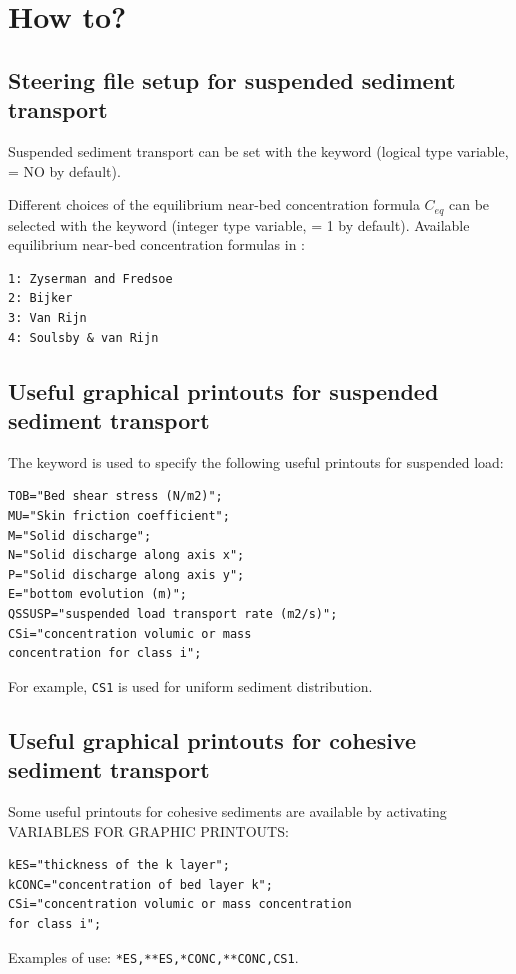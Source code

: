 \pagebreak
\section{How to?}
\subsection{Steering file setup for suspended sediment transport}
Suspended sediment transport can be set with the keyword  (logical type variable, {\ttfamily = NO} by default).

Different choices of the equilibrium near-bed concentration formula $C_{eq}$ can be selected with the keyword  (integer type variable, {\ttfamily = 1} by default). Available equilibrium near-bed concentration formulas in \gaia{}:
\begin{verbatim}
1: Zyserman and Fredsoe
2: Bijker
3: Van Rijn
4: Soulsby & van Rijn
\end{verbatim}

\subsection{Useful graphical printouts for suspended sediment transport}
The keyword  is used to specify the following useful printouts for suspended load:
\begin{lstlisting}[frame=trBL]
TOB="Bed shear stress (N/m2)";
MU="Skin friction coefficient";
M="Solid discharge";
N="Solid discharge along axis x";
P="Solid discharge along axis y";
E="bottom evolution (m)";
QSSUSP="suspended load transport rate (m2/s)";
CSi="concentration volumic or mass
concentration for class i";
\end{lstlisting}
For example, \texttt{CS1} is used for uniform sediment distribution.

\subsection{Useful graphical printouts for cohesive sediment transport}
Some useful printouts for cohesive sediments are available by activating {\ttfamily VARIABLES FOR GRAPHIC PRINTOUTS}:
\begin{lstlisting}[frame=trBL]
kES="thickness of the k layer";
kCONC="concentration of bed layer k";
CSi="concentration volumic or mass concentration
for class i";
\end{lstlisting}
Examples of use: \texttt{*ES,**ES,*CONC,**CONC,CS1}.

